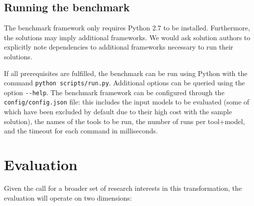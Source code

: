 \documentclass[a4paper]{scrartcl}
\newcommand*{\file}[1]{\texttt{#1}}
\begin{document}
\subsection{Running the benchmark}
\label{sec:running-benchmark}

The benchmark framework only requires Python 2.7 to be installed. Furthermore,
the solutions may imply additional frameworks. We would ask solution authors to
explicitly note dependencies to additional frameworks necessary to run their
solutions.

If all prerequisites are fulfilled, the benchmark can be run using Python with
the command \file{python scripts/run.py}. Additional options can be queried
using the option \file{{-}{-}help}. The benchmark framework can be configured
through the \file{config/config.json} file: this includes the input models to be
evaluated (some of which have been excluded by default due to their high cost with the sample solution), the names of the tools to be run, the number of runs per tool+model, and the timeout for each command in milliseconds.

\section{Evaluation}
\label{sec:evaluation}

Given the call for a broader set of research interests in this transformation,
the evaluation will operate on two dimensions:
\end{document}
